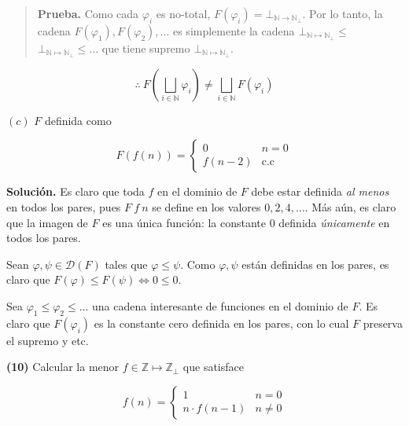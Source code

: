 \documentclass[article, 12pt]{article}
\begin{document}
\small
\begin{quote}

\textbf{Prueba.} Como cada $\varphi_i$ es no-total, $F(\varphi_i) = \bot_{\mathbb{N}\to
\mathbb{N}_\bot }$. Por lo tanto, la cadena $F(\varphi_1), F(\varphi_2), \ldots$
es simplemente la cadena $\bot_{\mathbb{N}\mapsto\mathbb{N}_\bot } \leq$
$\bot_{\mathbb{N}\mapsto\mathbb{N}_\bot } \leq \ldots$ que tiene supremo $\bot_{\mathbb{N}\mapsto\mathbb{N}_\bot }$. 

\end{quote}
\normalsize

\begin{equation*}
  \therefore  ~ F\left( \bigsqcup_{i \in \mathbb{N}} \varphi_i \right) \neq \bigsqcup_{i \in
  \mathbb{N}} F(\varphi_i)
\end{equation*}

\pagebreak

$(c)$ $F$ definida como 

\begin{equation*}
  F\left( f\left( n \right)  \right) = \begin{cases}
    0 & n = 0 \\ 
    f(n-2) & \text{c.c}
  \end{cases}
\end{equation*}

\textbf{Solución.} Es claro que toda $f$ en el dominio de $F$ debe estar
definida \textit{al menos} en todos los pares, pues $F~ f~ n$ se define en los
valores $0, 2, 4, \ldots$. Más aún, es claro que la imagen de $F$ es una única
función: la constante $0$ definida \textit{únicamente} en todos los pares. 

Sean $\varphi, \psi \in \mathcal{D}(F)$ tales que $\varphi \leq \psi$. Como
$\varphi, \psi$ están definidas en los pares, es claro que $F(\varphi) \leq
F(\psi) \iff 0 \leq 0$. 

Sea $\varphi_1 \leq \varphi_2 \leq \ldots$ una cadena interesante de funciones
en el dominio de $F$. Es claro que $F(\varphi_i)$ es la constante cero definida
en los pares, con lo cual $F$ preserva el supremo y etc.


\pagebreak 

\textbf{(10)} Calcular la menor $f \in \mathbb{Z} \mapsto \mathbb{Z}_\bot$ que
satisface 

\begin{equation*}
  f(n) = \begin{cases}
    1 & n = 0 \\ 
    n \cdot f(n-1) & n \neq 0
  \end{cases}
\end{equation*}
\end{document}
